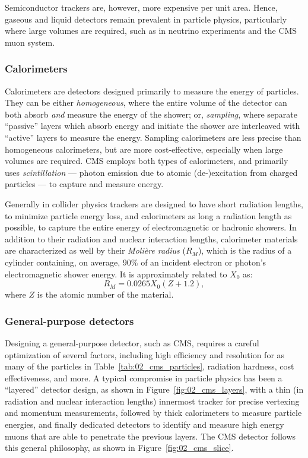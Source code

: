 Semiconductor trackers are, however, more expensive per unit area.
Hence, gaseous and liquid detectors remain prevalent in particle physics, particularly where large volumes are required, such as in neutrino experiments and the CMS muon system.

\subsubsection{Calorimeters}

Calorimeters are detectors designed primarily to measure the energy of particles.
They can be either \textit{homogeneous}, where the entire volume of the detector can both absorb \textit{and} measure the energy of the shower; or, \textit{sampling}, where separate ``passive'' layers which absorb energy and initiate the shower are interleaved with ``active'' layers to measure the energy.
Sampling calorimeters are less precise than homogeneous calorimeters, but are more cost-effective, especially when large volumes are required.
CMS employs both types of calorimeters, and primarily uses \textit{scintillation} --- photon emission due to atomic (de-)excitation from charged particles --- to capture and measure energy.

Generally in collider physics trackers are designed to have short radiation lengths, to minimize particle energy loss, and calorimeters as long a radiation length as possible, to capture the entire energy of electromagnetic or hadronic showers.
In addition to their radiation and nuclear interaction lengths, calorimeter materials are characterized as well by their \textit{Moli\`ere radius} ($R_M$), which is the radius of a cylinder containing, on average, 90\% of an incident electron or photon's electromagnetic shower energy.
It is approximately related to $X_0$ as:
\begin{equation}
    \label{eq:02_cms_moliere}
    R_M = 0.0265 X_0 (Z + 1.2),
\end{equation}
where $Z$ is the atomic number of the material.

\subsubsection{General-purpose detectors}

Designing a general-purpose detector, such as CMS, requires a careful optimization of several factors, including high efficiency and resolution for as many of the particles in Table~\ref{tab:02_cms_particles}, radiation hardness, cost effectiveness, and more.
A typical compromise in particle physics has been a ``layered'' detector design, as shown in Figure~\ref{fig:02_cms_layers}, with a thin (in radiation and nuclear interaction lengths) innermost tracker for precise vertexing and momentum measurements, followed by thick calorimeters to measure particle energies, and finally dedicated detectors to identify and measure high energy muons that are able to penetrate the previous layers.
The CMS detector follows this general philosophy, as shown in Figure~\ref{fig:02_cms_slice}.

